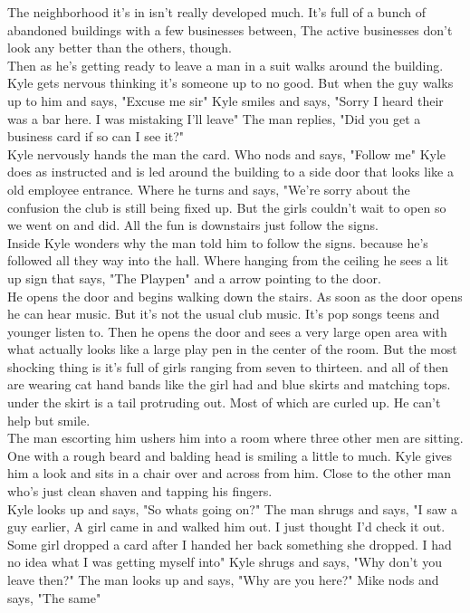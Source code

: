 \documentclass {article}[12pt]
\begin{document}
The neighborhood it's in isn't really developed much. It's full of a bunch of abandoned buildings with a few businesses between, The active businesses don't look any better than the others, though.\\ 

Then as he's getting ready to leave a man in a suit walks around the building. Kyle gets nervous thinking it's someone up to no good. But when the guy walks up to him and says, "Excuse me sir" Kyle smiles and says, "Sorry I heard their was a bar here. I was mistaking I'll leave" The man replies, "Did you get a business card if so can I see it?"\\

Kyle nervously hands the man the card. Who nods and says, "Follow me" Kyle does as instructed and is led around the building to a side door that looks like a old employee entrance. Where he turns and says, "We're sorry about the confusion the club is still being fixed up. But the girls couldn't wait to open so we went on and did. All the fun is downstairs just follow the signs.\\

Inside Kyle wonders why the man told him to follow the signs. because he's followed all they way into the hall. Where hanging from the ceiling he sees a lit up sign that says, "The Playpen" and a arrow pointing to the door.\\

He opens the door and begins walking down the stairs. As soon as the door opens he can hear music. But it's not the usual club music. It's pop songs teens and younger listen to. Then he opens the door and sees a very large open area with what actually looks like a large play pen in the center of the room. But the most shocking thing is it's full of girls ranging from seven to thirteen. and all of then are wearing cat hand bands like the girl had and blue skirts and matching tops. under the skirt is a tail protruding out. Most of which are curled up. He can't help but smile. \\

The man escorting him ushers him into a room where three other men are sitting. One with a rough beard and balding head is smiling a little to much. Kyle gives him a look and sits in a chair over and across from him. Close to the other man who's just clean shaven and tapping his fingers.\\

Kyle looks up and says, "So whats going on?" The man shrugs and says, "I saw a guy earlier, A girl came in and walked him out. I just thought I'd check it out. Some girl dropped a card after I handed her back something she dropped. I had no idea what I was getting myself into" Kyle shrugs and says, "Why don't you leave then?" The man looks up and says, "Why are you here?" Mike nods and says, "The same" \\
\end{document}
